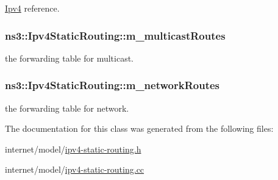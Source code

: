 \hyperlink{classns3_1_1Ipv4}{Ipv4} reference. 

\subsubsection[{\texorpdfstring{m\+\_\+multicast\+Routes}{m_multicastRoutes}}]{ ns3\+::\+Ipv4\+Static\+Routing\+::m\+\_\+multicast\+Routes\hspace{0.3cm}{\ttfamily [private]}}\hypertarget{classns3_1_1Ipv4StaticRouting_a5aaf2ee73a6590cc164ac9485d89b538}{}\label{classns3_1_1Ipv4StaticRouting_a5aaf2ee73a6590cc164ac9485d89b538}


the forwarding table for multicast. 

\subsubsection[{\texorpdfstring{m\+\_\+network\+Routes}{m_networkRoutes}}]{ ns3\+::\+Ipv4\+Static\+Routing\+::m\+\_\+network\+Routes\hspace{0.3cm}{\ttfamily [private]}}\hypertarget{classns3_1_1Ipv4StaticRouting_a81e0b111629b14fff2efbf69180a64c1}{}\label{classns3_1_1Ipv4StaticRouting_a81e0b111629b14fff2efbf69180a64c1}


the forwarding table for network. 



The documentation for this class was generated from the following files\+:\begin{DoxyCompactItemize}
\item 
internet/model/\hyperlink{ipv4-static-routing_8h}{ipv4-\/static-\/routing.\+h}\item 
internet/model/\hyperlink{ipv4-static-routing_8cc}{ipv4-\/static-\/routing.\+cc}\end{DoxyCompactItemize}

